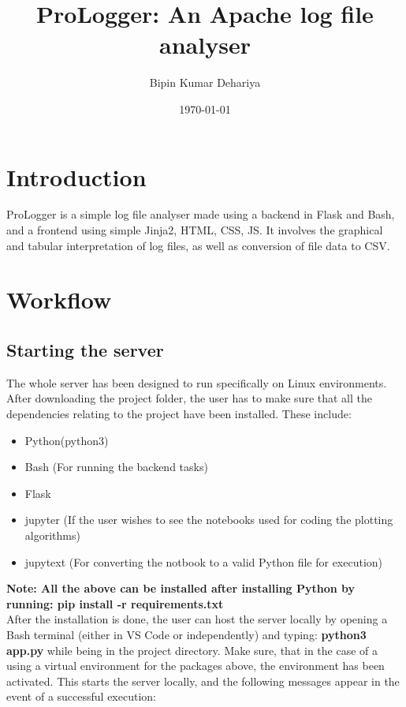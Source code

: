 \documentclass{article}
\title{ProLogger: An Apache log file analyser}
\author{Bipin Kumar Dehariya}
\date{\today}
\begin{document}
\tableofcontents
\maketitle

\section{Introduction}
    ProLogger is a simple log file analyser made using a backend in Flask and Bash, and a frontend using simple Jinja2, HTML, CSS, JS. It involves the graphical and tabular interpretation of log files, as well as conversion of file data to CSV.

\section{Workflow}
    \subsection{Starting the server}
        The whole server has been designed to run specifically on Linux environments. After downloading the project folder, the user has to make sure that all the dependencies relating to the project have been installed. These include:

        \begin{itemize}
            \item Python(python3)
            \item Bash (For running the backend tasks)
            \item Flask 
            \item jupyter (If the user wishes to see the notebooks used for coding the plotting algorithms)
            \item jupytext (For converting the notbook to a valid Python file for execution)
        \end{itemize}

        \textbf{Note: All the above can be installed after installing Python by running: pip install -r requirements.txt} \\

        After the installation is done, the user can host the server locally by opening a Bash terminal (either in VS Code or independently) and typing:  \textbf{python3 app.py} while being in the project directory. Make sure, that in the case of a using a virtual environment for the packages above, the environment has been activated. This starts the server locally, and the following messages appear in the event of a successful execution: \\
\end{document}
